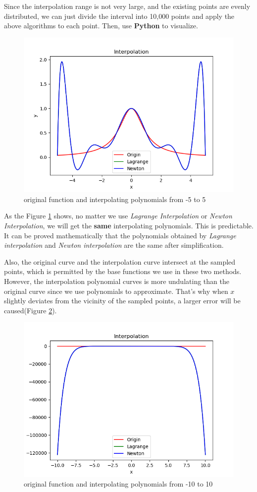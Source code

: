 \documentclass[a4paper]{article}
\begin{document}
Since the interpolation range is not very large, and the existing points are evenly distributed, we can just divide the interval into 10,000 points and apply the above algorithms to each point. Then, use \textbf{Python} to visualize.

\begin{figure}[!h]
    \centering
    \includegraphics[width=.6\textwidth]{./figures/Figure_1.png}
    \caption{original function and interpolating polynomials from -5 to 5}
    \label{fig:Figure_1}
\end{figure}
As the Figure \ref{fig:Figure_1} shows, no matter we use \emph{Lagrange Interpolation} or \emph{Newton Interpolation}, we will get the \textbf{same} interpolating polynomials.
This is predictable.
It can be proved mathematically that the polynomials obtained by \emph{Lagrange interpolation} and \emph{Newton interpolation} are the same after simplification.

Also, the original curve and the interpolation curve intersect at the sampled points, which is permitted by the base functions we use in these two methods.
However, the interpolation polynomial curves is more undulating than the original curve since we use polynomials to approximate.
That's why when $x$ slightly deviates from the vicinity of the sampled points, a larger error will be caused(Figure \ref{fig:Figure_2}).
\begin{figure}[!h]
    \centering
    \includegraphics[width=.6\textwidth]{./figures/Figure_2.png}
    \caption{original function and interpolating polynomials from -10 to 10}
    \label{fig:Figure_2}
\end{figure}
\end{document}
